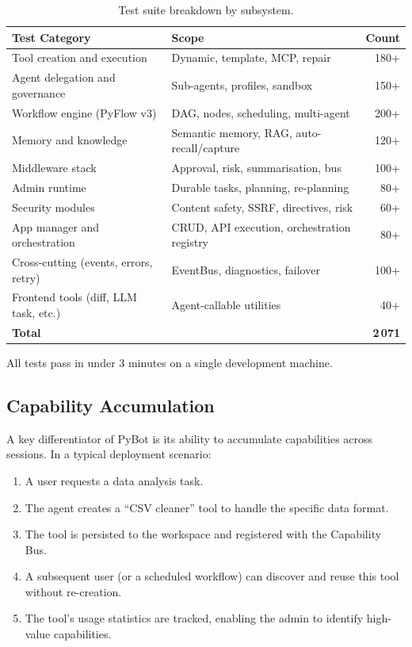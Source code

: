 \documentclass[11pt,a4paper]{article}
\begin{document}
\begin{table}[h]
\centering
\small
\begin{tabularx}{\textwidth}{Xlr}
\toprule
\textbf{Test Category} & \textbf{Scope} & \textbf{Count} \\
\midrule
Tool creation and execution & Dynamic, template, MCP, repair & 180+ \\
Agent delegation and governance & Sub-agents, profiles, sandbox & 150+ \\
Workflow engine (PyFlow v3) & DAG, nodes, scheduling, multi-agent & 200+ \\
Memory and knowledge & Semantic memory, RAG, auto-recall/capture & 120+ \\
Middleware stack & Approval, risk, summarisation, bus & 100+ \\
Admin runtime & Durable tasks, planning, re-planning & 80+ \\
Security modules & Content safety, SSRF, directives, risk & 60+ \\
App manager and orchestration & CRUD, API execution, orchestration registry & 80+ \\
Cross-cutting (events, errors, retry) & EventBus, diagnostics, failover & 100+ \\
Frontend tools (diff, LLM task, etc.) & Agent-callable utilities & 40+ \\
\midrule
\textbf{Total} & & \textbf{2\,071} \\
\bottomrule
\end{tabularx}
\caption{Test suite breakdown by subsystem.}
\label{tab:tests}
\end{table}

All tests pass in under 3 minutes on a single development machine.

\subsection{Capability Accumulation}

A key differentiator of PyBot is its ability to accumulate capabilities across sessions.
In a typical deployment scenario:
\begin{enumerate}
  \item A user requests a data analysis task.
  \item The agent creates a ``CSV cleaner'' tool to handle the specific data format.
  \item The tool is persisted to the workspace and registered with the Capability Bus.
  \item A subsequent user (or a scheduled workflow) can discover and reuse this tool without re-creation.
  \item The tool's usage statistics are tracked, enabling the admin to identify high-value capabilities.
\end{enumerate}
\end{document}
